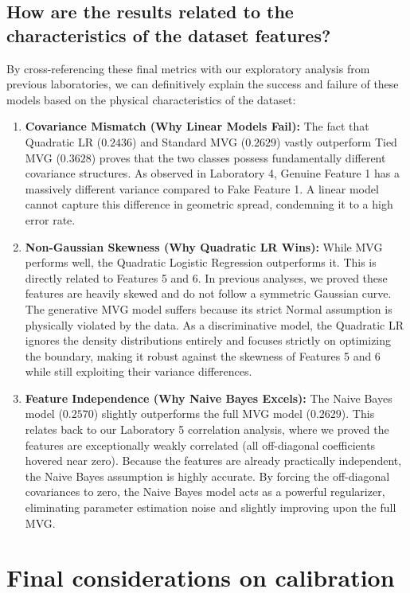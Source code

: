 \subsection*{How are the results related to the characteristics of the dataset features?}

By cross-referencing these final metrics with our exploratory analysis from previous laboratories, we can definitively explain the success and failure of these models based on the physical characteristics of the dataset:

\begin{enumerate}
    \item \textbf{Covariance Mismatch (Why Linear Models Fail):} The fact that Quadratic LR ($0.2436$) and Standard MVG ($0.2629$) vastly outperform Tied MVG ($0.3628$) proves that the two classes possess fundamentally different covariance structures. As observed in Laboratory 4, Genuine Feature 1 has a massively different variance compared to Fake Feature 1. A linear model cannot capture this difference in geometric spread, condemning it to a high error rate.
    \item \textbf{Non-Gaussian Skewness (Why Quadratic LR Wins):} While MVG performs well, the Quadratic Logistic Regression outperforms it. This is directly related to Features 5 and 6. In previous analyses, we proved these features are heavily skewed and do not follow a symmetric Gaussian curve. The generative MVG model suffers because its strict Normal assumption is physically violated by the data. As a discriminative model, the Quadratic LR ignores the density distributions entirely and focuses strictly on optimizing the boundary, making it robust against the skewness of Features 5 and 6 while still exploiting their variance differences.
    \item \textbf{Feature Independence (Why Naive Bayes Excels):} The Naive Bayes model ($0.2570$) slightly outperforms the full MVG model ($0.2629$). This relates back to our Laboratory 5 correlation analysis, where we proved the features are exceptionally weakly correlated (all off-diagonal coefficients hovered near zero). Because the features are already practically independent, the Naive Bayes assumption is highly accurate. By forcing the off-diagonal covariances to zero, the Naive Bayes model acts as a powerful regularizer, eliminating parameter estimation noise and slightly improving upon the full MVG.
\end{enumerate}

\section{Final considerations on calibration}

